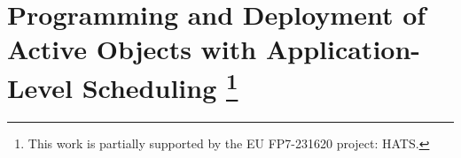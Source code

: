 
\chapter[Application-Level Scheduling]{Programming and Deployment of Active Objects with Application-Level Scheduling%
\footnote{This work is partially supported by the EU FP7-231620 project: HATS.}
}
% 
\label{ch:p01:ch01}
% 





  
